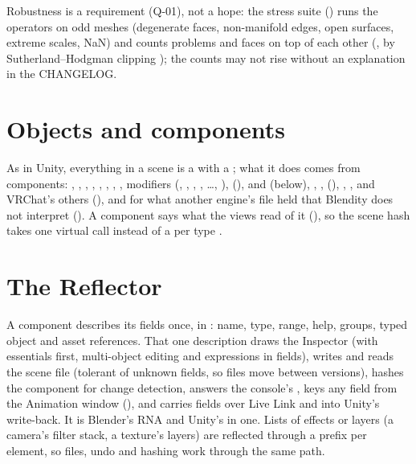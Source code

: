 Robustness is a requirement (Q-01), not a hope: the stress suite () runs the operators on
odd meshes (degenerate faces, non-manifold edges, open surfaces, extreme scales, NaN) and counts problems and faces on
top of each other (, by Sutherland--Hodgman clipping \cite{Sutherland1974}); the counts may not
rise without an explanation in the CHANGELOG.

\section{Objects and components}
As in Unity, everything in a scene is a  with a ; what it does comes from components:
, , , , , ,
, , modifiers (, , , , \ldots,
),  (),  and  (below), , , 
(), , ,  and VRChat's others (), and
 for what another engine's file held that Blendity does not interpret (). A component
says what the views read of it (), so the scene hash takes one virtual call instead of a
 per type \cite{Gregory2018vol2}.

\section{The Reflector}
A component describes its fields once, in : name, type, range, help, groups, typed object
and asset references. That one description draws the Inspector (with essentials first, multi-object editing and
expressions in fields), writes and reads the scene file (tolerant of unknown fields, so files move between versions),
hashes the component for change detection, answers the console's , keys any field from
the Animation window (), and carries fields over Live Link and into Unity's write-back. It is Blender's RNA
\cite{Blender2026} and Unity's  in one. Lists of effects or layers (a camera's filter stack, a
texture's layers) are reflected through a prefix per element, so files, undo and hashing work through the same path.

